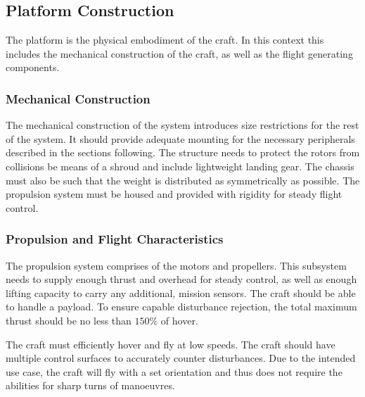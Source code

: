 		\subsection{Platform Construction}
		The platform is the physical embodiment of the craft. In this context this includes the mechanical construction of the craft, as well as the flight generating components.
		
			\subsubsection{Mechanical Construction}
			The mechanical construction of the system introduces size restrictions for the rest of the system. It should provide adequate mounting for the necessary peripherals described in the sections following. The structure needs to protect the rotors from collisions be means of a shroud and include lightweight landing gear. The chassis must also be such that the weight is distributed as symmetrically as possible. The propulsion system must be housed and provided with rigidity for steady flight control.
			
			\subsubsection{Propulsion and Flight Characteristics}
			The propulsion system comprises of the motors and propellers. This subsystem needs to supply enough thrust and overhead for steady control, as well as enough lifting capacity to carry any additional, mission sensors. The craft should be able to handle a \payLoadMass payload. To ensure capable disturbance rejection, the total maximum thrust should be no less than $150\%$ of hover.
			
			The craft must efficiently hover and fly at low speeds. The craft should have multiple control surfaces to accurately counter disturbances. Due to the intended use case, the craft will fly with a set orientation and thus does not require the abilities for sharp turns of manoeuvres.
		
		
